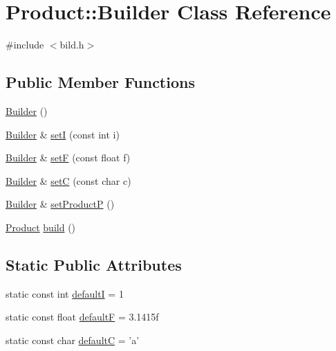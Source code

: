 \hypertarget{class_product_1_1_builder}{\section{Product\-:\-:Builder Class Reference}
\label{class_product_1_1_builder}
}


{\ttfamily \#include $<$bild.\-h$>$}

\subsection*{Public Member Functions}
\begin{DoxyCompactItemize}
\item 
\hyperlink{class_product_1_1_builder_a2e6f47ef6d55d2dce837d8009839f39b}{Builder} ()
\item 
\hyperlink{class_product_1_1_builder}{Builder} \& \hyperlink{class_product_1_1_builder_a93ed1ba2502313a485756b7679f58f62}{set\-I} (const int i)
\item 
\hyperlink{class_product_1_1_builder}{Builder} \& \hyperlink{class_product_1_1_builder_ae806626bc173caeb7c2a9f8292a2b7a7}{set\-F} (const float f)
\item 
\hyperlink{class_product_1_1_builder}{Builder} \& \hyperlink{class_product_1_1_builder_ab5b5de3177e7ec7b8e7fafc8ac951942}{set\-C} (const char c)
\item 
\hyperlink{class_product_1_1_builder}{Builder} \& \hyperlink{class_product_1_1_builder_aec19b8faff482995b662778fd204442f}{set\-Product\-P} ()
\item 
\hyperlink{class_product}{Product} \hyperlink{class_product_1_1_builder_adfe69f8939ffb8a9fabdba9f90bdfda9}{build} ()
\end{DoxyCompactItemize}
\subsection*{Static Public Attributes}
\begin{DoxyCompactItemize}
\item 
static const int \hyperlink{class_product_1_1_builder_a1fddb6d1d074e0d4bf645cdf7682e472}{default\-I} = 1
\item 
static const float \hyperlink{class_product_1_1_builder_a8cace4d757ea26d56f7617b54b5c613c}{default\-F} = 3.\-1415f
\item 
static const char \hyperlink{class_product_1_1_builder_a963b27187fd08baa3ca4889aef639431}{default\-C} = 'a'
\end{DoxyCompactItemize}


